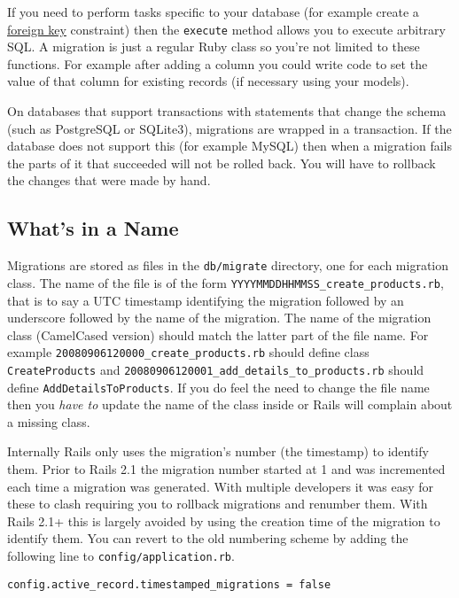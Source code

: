 \documentclass[10pt]{book}
\begin{document}
If you need to perform tasks specific to your database (for example create a \hyperlink{active-record-and-referential-integrity}{foreign key} constraint) then the \texttt{execute} method allows you to execute arbitrary SQL. A migration is just a regular Ruby class so you’re not limited to these functions. For example after adding a column you could write code to set the value of that column for existing records (if necessary using your models).

On databases that support transactions with statements that change the schema (such as PostgreSQL or SQLite3), migrations are wrapped in a transaction. If the database does not support this (for example MySQL) then when a migration fails the parts of it that succeeded will not be rolled back. You will have to rollback the changes that were made by hand.

\subsection{ What’s in a Name}

Migrations are stored as files in the \texttt{db/migrate} directory, one for each migration class. The name of the file is of the form \texttt{YYYYMMDDHHMMSS\_create\_products.rb}, that is to say a UTC timestamp identifying the migration followed by an underscore followed by the name of the migration. The name of the migration class (CamelCased version) should match the latter part of the file name. For example \texttt{20080906120000\_create\_products.rb} should define class \texttt{CreateProducts} and \texttt{20080906120001\_add\_details\_to\_products.rb} should define \texttt{AddDetailsToProducts}. If you do feel the need to change the file name then you \emph{have to} update the name of the class inside or Rails will complain about a missing class.

Internally Rails only uses the migration’s number (the timestamp) to identify them. Prior to Rails 2.1 the migration number started at 1 and was incremented each time a migration was generated. With multiple developers it was easy for these to clash requiring you to rollback migrations and renumber them. With Rails 2.1+ this is largely avoided by using the creation time of the migration to identify them. You can revert to the old numbering scheme by adding the following line to \texttt{config/application.rb}.

\begin{verbatim}
config.active_record.timestamped_migrations = false
\end{verbatim}
\end{document}
